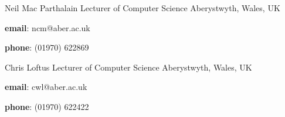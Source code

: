 

\begin{cventries}

  \cventry
    {Neil Mac Parthalain} %
    {Lecturer of Computer Science} %
    {Aberystwyth, Wales, UK} %
    {} %
    {
      \begin{cvitems} %
        \item {\textbf{email}: ncm@aber.ac.uk}
        \item {\textbf{phone}: (01970) 622869}
      \end{cvitems}
    }
    
  \cventry
    {Chris Loftus} %
    {Lecturer of Computer Science} %
    {Aberystwyth, Wales, UK} %
    {} %
    {
      \begin{cvitems} %
        \item {\textbf{email}: cwl@aber.ac.uk}
        \item {\textbf{phone}: (01970) 622422}
      \end{cvitems}
    }

\end{cventries}
